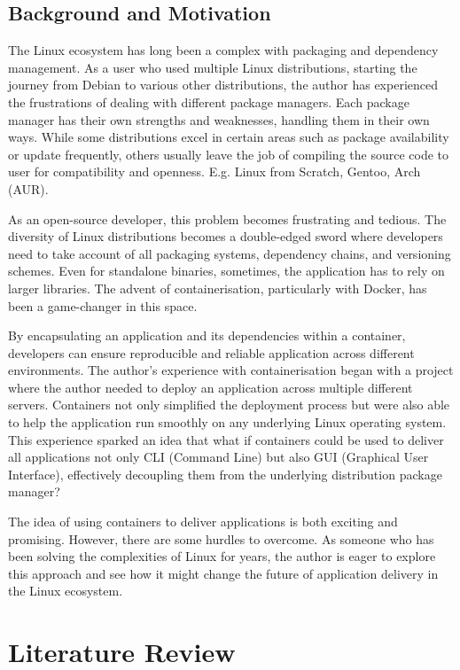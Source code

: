 \documentclass[journal,onecolumn]{IEEEtran}
\begin{document}
 
\newpage
\subsection{Background and Motivation}
The Linux ecosystem has long been a complex with packaging and dependency management. As a user who used multiple Linux distributions, starting the journey from Debian to various other distributions, the author has experienced the frustrations of dealing with different package managers. Each package manager has their own strengths and weaknesses, handling them in their own ways. While some distributions excel in certain areas such as package availability or update frequently, others usually leave the job of compiling the source code to user for compatibility and openness. E.g. Linux from Scratch, Gentoo, Arch (AUR). 

As an open-source developer, this problem becomes frustrating and tedious. The diversity of Linux distributions becomes a double-edged sword where developers need to take account of all packaging systems, dependency chains, and versioning schemes. Even for standalone binaries, sometimes, the application has to rely on larger libraries. The advent of containerisation, particularly with Docker, has been a game-changer in this space. 

By encapsulating an application and its dependencies within a container, developers can ensure reproducible and reliable application across different environments. The author’s experience with containerisation began with a project where the author needed to deploy an application across multiple different servers. Containers not only simplified the deployment process but were also able to help the application run smoothly on any underlying Linux operating system. This experience sparked an idea that what if containers could be used to deliver all applications not only CLI (Command Line) but also GUI (Graphical User Interface), effectively decoupling them from the underlying distribution package manager? 

The idea of using containers to deliver applications is both exciting and promising. However, there are some hurdles to overcome. As someone who has been solving the complexities of Linux for years, the author is eager to explore this approach and see how it might change the future of application delivery in the Linux ecosystem. 

\newpage
\section{Literature Review}
\end{document}
